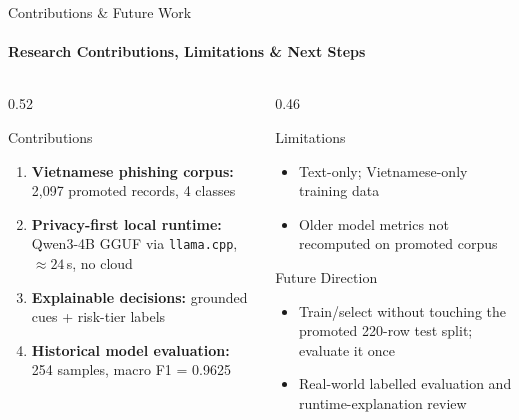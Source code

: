 \begin{frame}{Contributions \& Future Work}
  \framesubtitle{Research Contributions, Limitations \& Next Steps}
  \begin{columns}[T,onlytextwidth]
    \begin{column}{0.52\textwidth}
      \begin{block}{Contributions}
        {\footnotesize
        \begin{enumerate}
          \item \textbf{Vietnamese phishing corpus:} 2,097 promoted records, 4 classes
          \item \textbf{Privacy-first local runtime:} Qwen3-4B GGUF via \texttt{llama.cpp}, ${\approx}24$\,s, no cloud
          \item \textbf{Explainable decisions:} grounded cues + risk-tier labels
          \item \textbf{Historical model evaluation:} 254 samples, macro F1 = 0.9625
        \end{enumerate}}
      \end{block}
    \end{column}
    \begin{column}{0.46\textwidth}
      \begin{alertblock}{Limitations}
        {\footnotesize
        \begin{itemize}
          \item Text-only; Vietnamese-only training data
          \item Older model metrics not recomputed on promoted corpus
        \end{itemize}}
      \end{alertblock}
      \vspace{-3pt}
      \begin{block}{Future Direction}
        {\footnotesize
        \begin{itemize}
          \setlength{\itemsep}{1pt}
          \item Train/select without touching the promoted 220-row test split; evaluate it once
          \item Real-world labelled evaluation and runtime-explanation review
        \end{itemize}}
      \end{block}
    \end{column}
  \end{columns}
\end{frame}
